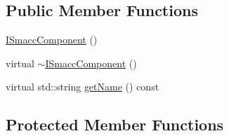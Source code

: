 \subsection*{Public Member Functions}
\begin{DoxyCompactItemize}
\item 
\hyperlink{classsmacc_1_1ISmaccComponent_a43952d7269ddb81d017a80f018fe502e}{I\+Smacc\+Component} ()
\item 
virtual \hyperlink{classsmacc_1_1ISmaccComponent_a46f5cfc6a308de938b6ee3a5e80a8fe9}{$\sim$\+I\+Smacc\+Component} ()
\item 
virtual std\+::string \hyperlink{classsmacc_1_1ISmaccComponent_a8bfa94b1b1c616d55837ebba1b426c6e}{get\+Name} () const
\end{DoxyCompactItemize}
\subsection*{Protected Member Functions}
